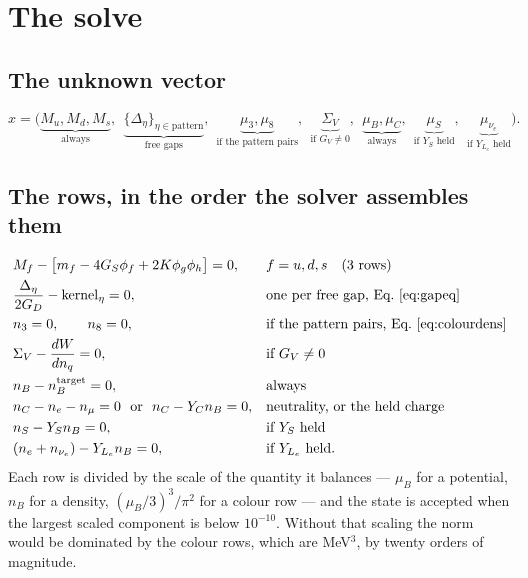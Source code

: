\documentclass[aps,prc,onecolumn,superscriptaddress,nofootinbib,10pt]{revtex4-2}
\newcommand{\nB}{n_B}
\newcommand{\nC}{n_C}
\newcommand{\nS}{n_S}
\newcommand{\nq}{n_q}
\newcommand{\muB}{\mu_B}
\newcommand{\muC}{\mu_C}
\newcommand{\muS}{\mu_S}
\newcommand{\munue}{\mu_{\nu_e}}
\newcommand{\GS}{G_S}
\newcommand{\GD}{G_D}
\newcommand{\GV}{G_V}
\begin{document}
\section{The solve}
\label{sec:solve}

\subsection{The unknown vector}

\begin{equation}
  x = \Big(\underbrace{M_u, M_d, M_s}_{\text{always}},\ \
      \underbrace{\{\Delta_\eta\}_{\eta \in \text{pattern}}}_{\text{free gaps}},\ \
      \underbrace{\mu_3, \mu_8}_{\text{if the pattern pairs}},\ \
      \underbrace{\Sigma_V}_{\text{if } \GV \neq 0},\ \
      \underbrace{\muB, \muC}_{\text{always}},\ \
      \underbrace{\muS}_{\text{if } Y_S \text{ held}},\ \
      \underbrace{\munue}_{\text{if } Y_{L_e} \text{ held}} \Big) .
\end{equation}

\subsection{The rows, in the order the solver assembles them}

\begin{align}
  &M_f - \big[m_f - 4\GS \phi_f + 2K \phi_g \phi_h\big] = 0 ,
   && f = u,d,s \quad \text{(3 rows)} \\
  &\frac{\Delta_\eta}{2\GD} - \mathrm{kernel}_\eta = 0 ,
   && \text{one per free gap, Eq.~\eqref{eq:gapeq}} \\
  &n_3 = 0 , \qquad n_8 = 0 ,
   && \text{if the pattern pairs, Eq.~\eqref{eq:colourdens}} \\
  &\Sigma_V - \frac{dW}{d\nq} = 0 ,
   && \text{if } \GV \neq 0 \\
  &\nB - \nB^{\rm target} = 0 ,
   && \text{always} \\
  &\nC - n_e - n_\mu = 0 \ \ \text{or}\ \ \nC - Y_C \nB = 0 ,
   && \text{neutrality, or the held charge} \\
  &\nS - Y_S \nB = 0 ,
   && \text{if } Y_S \text{ held} \\
  &(n_e + n_{\nu_e}) - Y_{L_e}\nB = 0 ,
   && \text{if } Y_{L_e} \text{ held.}
\end{align}
Each row is divided by the scale of the quantity it balances --- $\muB$ for a
potential, $\nB$ for a density, $(\muB/3)^3/\pi^2$ for a colour row --- and the
state is accepted when the largest scaled component is below
$10^{-10}$. Without that scaling the norm would be dominated by the colour
rows, which are MeV$^3$, by twenty orders of magnitude.
\end{document}
